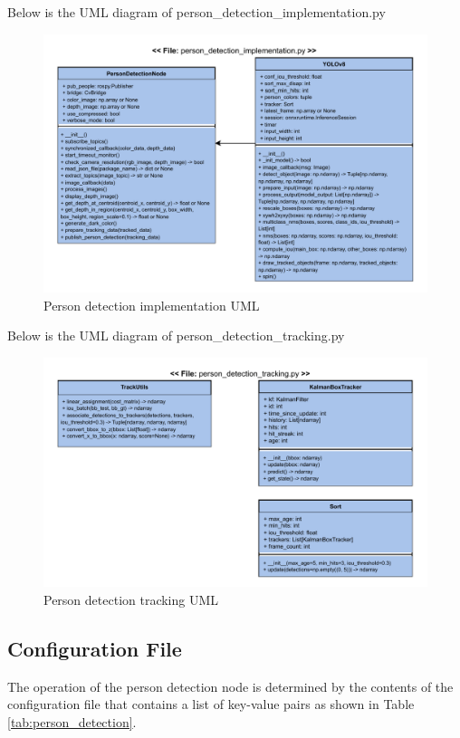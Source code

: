 \documentclass{CSSRforAfrica}
\begin{document}
Below is the UML diagram of person\_detection\_implementation.py
\begin{figure}[!hbpt]
	\centering
	\includegraphics[scale=0.75]{images/Person_implementation_UML.pdf}
	\caption{Person detection implementation UML}
	\label{fig:Person_implementation_UML}
\end{figure}

Below is the UML diagram of person\_detection\_tracking.py
\begin{figure}[!hbpt]
	\centering
	\includegraphics[scale=0.75]{images/Person_Tracking_UML.pdf}
	\caption{Person detection tracking UML}
	\label{fig:Person detection tracking UML}
\end{figure}

\newpage

\subsection*{Configuration File}
The operation of the person detection node is determined by the contents of the configuration file that contains a list of key-value pairs as shown in Table \ref{tab:person_detection}. 
\end{document}
